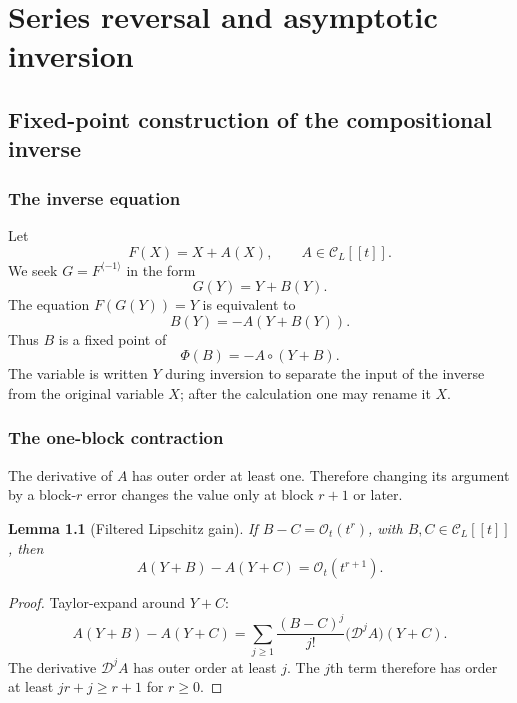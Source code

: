 \documentclass[11pt,oneside]{book}
\newtheorem{lemma}[theorem]{Lemma}
\theoremstyle{definition}
\theoremstyle{remark}
\newcommand{\D}{\mathcal D}
\newcommand{\bigO}{\mathcal O}
\newcommand{\compinv}{^{\langle-1\rangle}}
\newcommand{\compose}{\mathbin{\circ}}
\begin{document}
\part{Series reversal and asymptotic inversion}
\label{part:reversion}

\chapter{Fixed-point construction of the compositional inverse}
\label{ch:reversion-fixed}

\section{The inverse equation}
Let
\begin{equation}\label{eq:F-near-id-reversion}
 F(X)=X+A(X),
 \qquad A\in\mathcal C_L[[t]].
\end{equation}
We seek $G=F\compinv$ in the form
\[
 G(Y)=Y+B(Y).
\]
The equation $F(G(Y))=Y$ is equivalent to
\begin{equation}\label{eq:inverse-fixed-B}
 B(Y)=-A(Y+B(Y)).
\end{equation}
Thus $B$ is a fixed point of
\begin{equation}\label{eq:Phi-inverse}
 \Phi(B)=-A\compose(Y+B).
\end{equation}
The variable is written $Y$ during inversion to separate the input of the
inverse from the original variable $X$; after the calculation one may rename
it $X$.

\section{The one-block contraction}
The derivative of $A$ has outer order at least one.  Therefore changing its
argument by a block-$r$ error changes the value only at block $r+1$ or later.

\begin{lemma}[Filtered Lipschitz gain]\label{lem:inverse-contraction}
If $B-C=\bigO_t(t^r)$, with $B,C\in\mathcal C_L[[t]]$, then
\begin{equation}\label{eq:inverse-contraction}
 A(Y+B)-A(Y+C)=\bigO_t(t^{r+1}).
\end{equation}
\end{lemma}
\begin{proof}
Taylor-expand around $Y+C$:
\[
 A(Y+B)-A(Y+C)
 =\sum_{j\ge1}\frac{(B-C)^j}{j!}
 \bigl(\D^jA\bigr)(Y+C).
\]
The derivative $\D^jA$ has outer order at least $j$.  The $j$th term therefore
has order at least $jr+j\ge r+1$ for $r\ge0$.
\end{proof}
\end{document}
